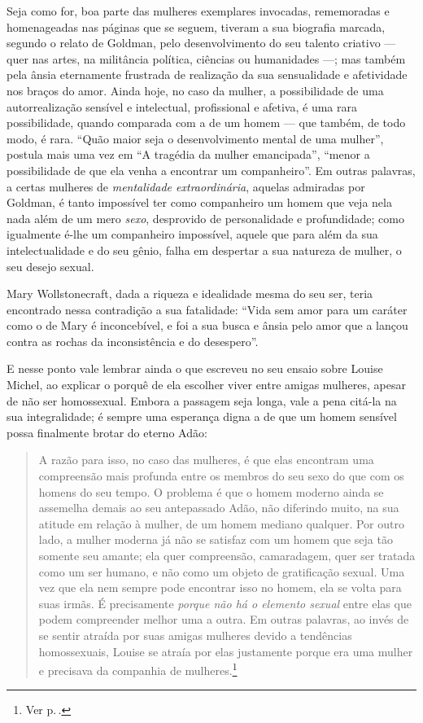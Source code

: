 Seja como for, boa parte das mulheres exemplares invocadas,
rememoradas e homenageadas nas páginas que se seguem, tiveram a sua
biografia marcada, segundo o relato de Goldman, pelo desenvolvimento do
seu talento criativo --- quer nas artes, na militância política, ciências
ou humanidades ---; mas também pela ânsia eternamente frustrada de
realização da sua sensualidade e afetividade nos braços do amor. Ainda
hoje, no caso da mulher, a possibilidade de uma autorrealização sensível
e intelectual, profissional e afetiva, é uma rara possibilidade, quando
comparada com a de um homem --- que também, de todo modo, é rara. ``Quão
maior seja o desenvolvimento mental de uma mulher'', postula mais uma
vez em ``A tragédia da mulher emancipada'', ``menor a possibilidade de
que ela venha a encontrar um companheiro''. Em outras palavras, a certas
mulheres de \textit{mentalidade extraordinária}, aquelas admiradas por
Goldman, é tanto impossível ter como companheiro um homem que veja nela
nada além de um mero \textit{sexo}, desprovido de personalidade e
profundidade; como igualmente é-lhe um companheiro impossível, aquele
que para além da sua intelectualidade e do seu gênio, falha em despertar
a sua natureza de mulher, o seu desejo sexual. 

Mary Wollstonecraft, dada
a riqueza e idealidade mesma do seu ser, teria encontrado nessa
contradição a sua fatalidade: ``Vida sem amor para um caráter como o de
Mary é inconcebível, e foi a sua busca e ânsia pelo amor que a lançou
contra as rochas da inconsistência e do desespero''.


E nesse ponto vale lembrar ainda o que
escreveu no seu ensaio sobre Louise Michel, ao explicar o porquê de ela
escolher viver entre amigas mulheres, apesar de não ser homossexual.
Embora a passagem seja longa, vale a pena citá-la na sua integralidade;
é sempre uma esperança digna a de que um homem sensível possa finalmente
brotar do eterno Adão:

\begin{quote}
A razão para isso, no caso das mulheres, é que elas encontram uma
compreensão mais profunda entre os membros do seu sexo do que
com os homens do seu tempo. O problema é que o homem moderno ainda se
assemelha demais ao seu antepassado Adão, não diferindo muito, na sua
atitude em relação à mulher, de um homem mediano qualquer. Por outro
lado, a mulher moderna já não se satisfaz com um homem que seja tão
somente seu amante; ela quer compreensão, camaradagem, quer ser tratada
como um ser humano, e não como um objeto de gratificação sexual. Uma vez
que ela nem sempre pode encontrar isso no homem, ela se volta para suas
irmãs. É precisamente \emph{porque não há o elemento sexual} entre elas
que podem compreender melhor uma a outra. Em outras palavras, ao
invés de se sentir atraída por suas amigas mulheres devido a
tendências homossexuais, Louise se atraía por elas justamente porque era
uma mulher e precisava da companhia de mulheres.\footnote{Ver p.\,\pageref{louise}.}
\end{quote}

